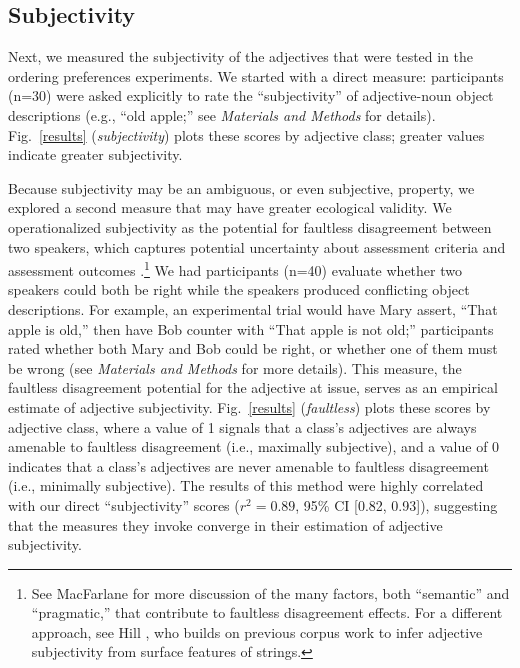 \documentclass{pnastwo}
\newcommand{\ndg}[1]{\textcolor{Green}{[ndg: #1]}}
\begin{document}
\begin{article}
\section{Subjectivity}

Next, we measured the subjectivity of the adjectives that were tested in the ordering preferences experiments. We started with a direct measure: participants (n=30) were asked explicitly to rate the ``subjectivity'' of adjective-noun object descriptions (e.g.,  ``old apple;'' see \emph{Materials and Methods} for details).
Fig.\ \ref{results} (\emph{subjectivity}) plots these scores by adjective class; greater values indicate greater subjectivity.

Because subjectivity may be an ambiguous, or even subjective, property, we explored a second measure that may have greater ecological validity. 
We operationalized subjectivity as the potential for faultless disagreement between two speakers, which captures potential uncertainty about assessment criteria and assessment outcomes \cite{kolbel2002,kennedy2013,barker2013}.\footnote{See MacFarlane \cite{macfarlane2014} for more discussion of the many factors, both ``semantic'' and ``pragmatic,'' that contribute to faultless disagreement effects. For a different approach, see Hill \cite{hill2012}, who builds on previous corpus work \cite{wulff2003} to infer adjective subjectivity from surface features of strings.}
We had participants (n=40) evaluate whether two speakers could both be right while the speakers produced conflicting object descriptions. For example, an experimental trial would have Mary assert, ``That apple is old,'' then have Bob counter with ``That apple is not old;'' 
participants rated whether both Mary and Bob could be right, or whether one of them must be wrong (see \emph{Materials and Methods} for more details). This measure, the faultless disagreement potential for the adjective at issue, serves as an empirical estimate of adjective subjectivity. 
Fig.\ \ref{results} (\emph{faultless}) plots these scores by adjective class, where a value of 1 signals that a class's adjectives are always amenable to faultless disagreement (i.e., maximally subjective), and a value of 0 indicates that a class's adjectives are never amenable to faultless disagreement (i.e., minimally subjective).
The results of this method were highly correlated with our direct ``subjectivity'' scores ($r^{2} = 0.89$, 95\% CI [0.82, 0.93]), suggesting that the measures they invoke converge in their estimation of adjective subjectivity. %


\end{article}
\end{document}
